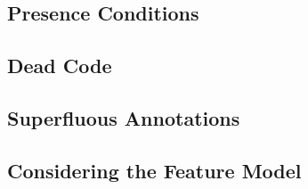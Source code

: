 
\subsection{Presence Conditions}

\subsection{Dead Code} %


\subsection{Superfluous Annotations}


\subsection{Considering the Feature Model}

